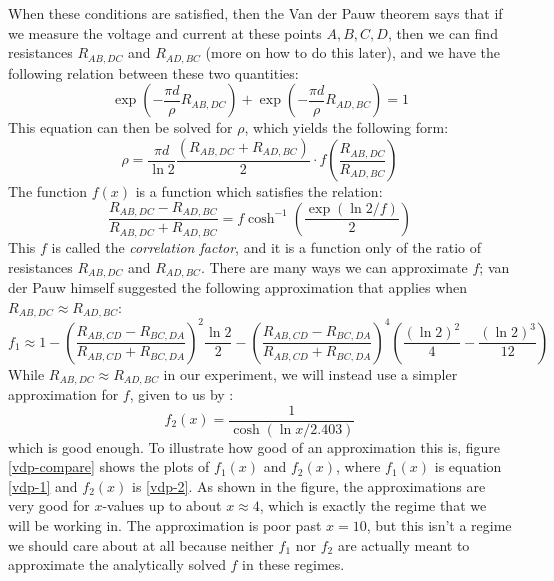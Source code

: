\documentclass[10pt]{article}
\begin{document}
	When these conditions are satisfied, then the Van der Pauw theorem says that if we measure the voltage and
	current at these points \( A, B, C, D \), then we can find resistances \( R_{AB, DC} \) and \( R_{AD, BC}
	\) (more on how to do this later), and we have the following relation between these two quantities:
	\[
		\exp\left( -\frac{\pi d}{\rho}R_{AB, DC} \right) + \exp\left( -\frac{\pi d}{\rho}R_{AD, BC} \right) =
		1
	\]
	This equation can then be solved for \( \rho \), which yields the following form:
	\[
		\rho = \frac{\pi d}{\ln 2} \frac{(R_{AB, DC} + R_{AD, BC})}{2} \cdot f\left( \frac{R_{AB, DC}}{R_{AD,
		BC}}\right)
	\]
	The function \( f(x) \) is a function which satisfies the relation:
	\[
		\frac{R_{AB, DC} - R_{AD, BC}}{R_{AB, DC} + R_{AD, BC}} = f \cosh^{-1}\left( \frac{\exp(\ln 2 / f)}{2} \right)
	\] 
	This \( f \) is called the \textit{correlation factor}, and it is a function only of the ratio of
	resistances \( R_{AB, DC} \) and \( R_{AD, BC} \). There are many ways we can approximate \( f \); van
	der Pauw himself suggested the following approximation that applies when \( R_{AB, DC} \approx R_{AD,
	BC}\):
	\begin{equation}
		\label{vdp-1}
		f_1 \approx 1 - \left( \frac{R_{AB, CD} - R_{BC, DA}}{R_{AB, CD} + R_{BC, DA}} \right)^2 \frac{\ln
		2}{2} - \left( \frac{R_{AB, CD} - R_{BC, DA}}{R_{AB, CD} + R_{BC, DA}} \right)^{4} \left( \frac{(\ln
		2)^2}{4} - \frac{(\ln 2)^3}{12} \right)
	\end{equation}
	While \( R_{AB, DC} \approx R_{AD, BC} \) in our experiment, we will instead use a simpler approximation
	for \( f \), given to us by \cite{lab-manual}:
	\begin{equation}
		\label{vdp-2}
		f_2(x) = \frac{1}{\cosh(\ln x / 2.403)}
	\end{equation}
	which is good enough. To illustrate how good of an approximation this is, figure \ref{vdp-compare} shows the plots
	of \( f_1(x) \) and \( f_2(x) \), where \( f_1(x) \) is equation \ref{vdp-1} and \( f_2(x) \) is
	\ref{vdp-2}. As shown in the figure, the approximations are very good for \( x \)-values up to about \( x
	\approx 4\), which is exactly the regime that we will be working in. The approximation is poor past \( x
	= 10\), but this isn't a regime we should care about at all because neither \( f_1 \) nor \( f_2 \) are
	actually meant to approximate the analytically solved \( f \) in these regimes. 
\end{document}
